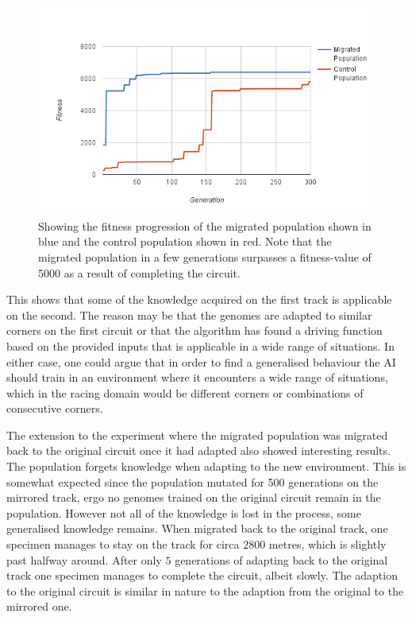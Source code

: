 \begin{figure}[H]
\includegraphics[width=\textwidth]{report/images/graphs/mirror_migration}
\centering
\caption{Showing the fitness progression of the migrated population shown in blue and the control population shown in red. Note that the migrated population in a few generations surpasses a fitness-value of 5000 as a result of completing the circuit.}
\label{fig:mirrordata}
\end{figure}

This shows that some of the knowledge acquired on the first track is applicable on the second. The reason may be that the genomes are adapted to similar corners on the first circuit or that the algorithm has found a driving function based on the provided inputs that is applicable in a wide range of situations. In either case, one could argue that in order to find a generalised behaviour the AI should train in an environment where it encounters a wide range of situations, which in the racing domain would be different corners or combinations of consecutive corners. 

The extension to the experiment where the migrated population was migrated back to the original circuit once it had adapted also showed interesting results. The population forgets knowledge when adapting to the new environment. This is somewhat expected since the population mutated for 500 generations on the mirrored track, ergo no genomes trained on the original circuit remain in the population. However not all of the knowledge is lost in the process, some generalised knowledge remains. When migrated back to the original track, one specimen manages to stay on the track for circa $2800$ metres, which is slightly past halfway around. After only $5$ generations of adapting back to the original track one specimen manages to complete the circuit, albeit slowly. The adaption to the original circuit is similar in nature to the adaption from the original to the mirrored one. 

